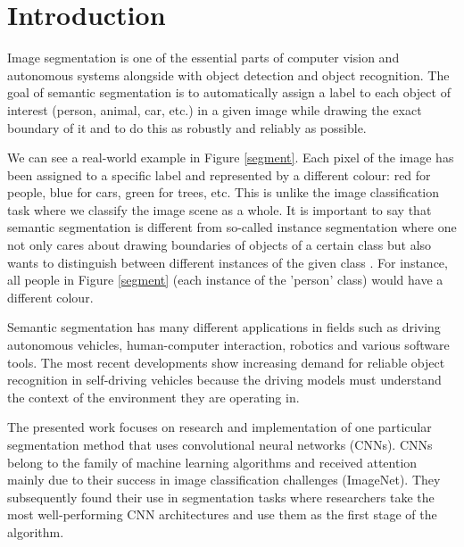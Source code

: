 \chapter{Introduction}
Image segmentation is one of the essential parts of computer vision and autonomous systems alongside with object detection and object recognition. The goal of semantic segmentation is to automatically assign a label to each object of interest (person, animal, car, etc.) in a given image while drawing the exact boundary of it and to do this as robustly and reliably as possible. 

We can see a real-world example in Figure \ref{segment}. Each pixel of the image has been assigned to a specific label and represented by a different colour: red for people, blue for cars, green for trees, etc. This is unlike the image classification task where we classify the image scene as a whole. It is important to say that semantic segmentation is different from so-called instance segmentation where one not only cares about drawing boundaries of objects of a certain class but also wants to distinguish between different instances of the given class \cite{stanford-L11}. For instance, all people in Figure \ref{segment} (each instance of the 'person' class) would have a different colour.

Semantic segmentation has many different applications in fields such as driving autonomous vehicles, human-computer interaction, robotics and various software tools. The most recent developments show increasing demand for reliable object recognition in self-driving vehicles because the driving models must understand the context of the environment they are operating in. \cite{mwiti}

The presented work focuses on research and implementation of one particular segmentation method that uses convolutional neural networks (CNNs). CNNs belong to the family of machine learning algorithms and received attention mainly due to their success in image classification challenges (ImageNet). They subsequently found their use in segmentation tasks where researchers take the most well-performing CNN architectures and use them as the first stage of the algorithm.


